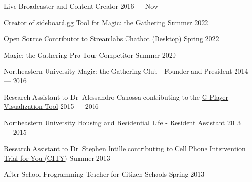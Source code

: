 Live Broadcaster and Content Creator    \hfill 2016 --- Now

Creator of \href{https://sideboard.gg}{sideboard.gg} Tool for Magic: the Gathering \hfill Summer 2022

Open Source Contributor to Streamlabs Chatbot (Desktop) \hfill Spring 2022

Magic: the Gathering Pro Tour Competitor \hfill Summer 2020

Northeastern University Magic: the Gathering Club - Founder and President   \hfill 2014 --- 2016

Research Assistant to Dr. Alessandro Canossa contributing to the \href{https://github.com/spacial-player-data-visualization/g-player-visualization}{G-Player Visualization Tool}   \hfill 2015 --- 2016

Northeastern University Housing and Residential Life - Resident Assistant   \hfill 2013 --- 2015

Research Assistant to Dr. Stephen Intille contributing to \href{https://www.mhealthgroup.org/projects.html}{Cell Phone Intervention Trial for You (CITY)}   \hfill Summer 2013

After School Programming Teacher for Citizen Schools   \hfill Spring 2013

